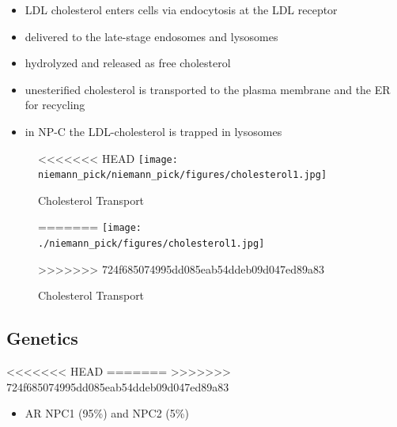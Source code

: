 \documentclass[fontsize=12pt]{scrartcl}
\begin{document}
\begin{enumerate}
\begin{enumerate}
\begin{enumerate}
\begin{enumerate}
\begin{table}[htbp]
\begin{enumerate}
\begin{enumerate}
\begin{itemize}
\item LDL cholesterol enters cells via endocytosis at the LDL receptor
\item delivered to the late-stage endosomes and lysosomes
\item hydrolyzed and released as free cholesterol
\item unesterified cholesterol is transported to the plasma membrane and the ER for recycling

\item in NP-C the LDL-cholesterol is trapped in lysosomes
\end{itemize}

\begin{figure}[htbp]
\centering
<<<<<<< HEAD
\texttt{[image: niemann\_pick/niemann\_pick/figures/cholesterol1.jpg]}
\caption{\label{fig:org937c526}Cholesterol Transport}
=======
\texttt{[image: ./niemann\_pick/figures/cholesterol1.jpg]}
\caption{\label{fig:orgf7f9df6}
Cholesterol Transport}
>>>>>>> 724f685074995dd085eab54ddeb09d047ed89a83
\end{figure}


\subsection{Genetics}
<<<<<<< HEAD
\label{sec:org07f3620}
=======
\label{sec:orgbf5a505}
>>>>>>> 724f685074995dd085eab54ddeb09d047ed89a83
\begin{itemize}
\item AR NPC1 (95\%) and NPC2 (5\%)
\end{itemize}


\end{enumerate}
\end{enumerate}
\end{table}
\end{enumerate}
\end{enumerate}
\end{enumerate}
\end{enumerate}
\end{document}
